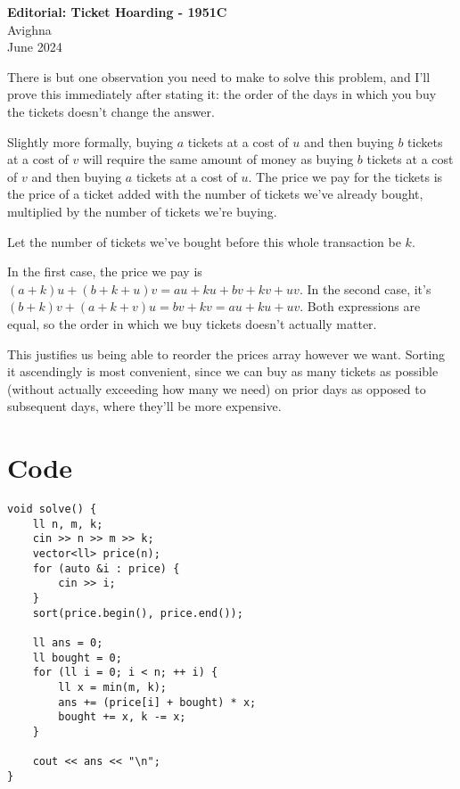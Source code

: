 \documentclass{article}
\begin{document}
\begin{center}
  \large{\textbf{Editorial: Ticket Hoarding - 1951C}}\\
  \vspace{0.2em}
  \large{Avighna}\\
  \vspace{0.2em}
  \large{June 2024}
\end{center}

There is but one observation you need to make to solve this problem, and I'll prove this immediately after stating it: the order of the days in which you buy the tickets doesn't change the answer.

Slightly more formally, buying $a$ tickets at a cost of $u$ and then buying $b$ tickets at a cost of $v$ will require the same amount of money as buying $b$ tickets at a cost of $v$ and then buying $a$ tickets at a cost of $u$. The price we pay for the tickets is the price of a ticket added with the number of tickets we've already bought, multiplied by the number of tickets we're buying.

Let the number of tickets we've bought before this whole transaction be $k$.

In the first case, the price we pay is $(a+k)u + (b+k+u)v = au + ku + bv + kv + uv$. In the second case, it's $(b+k)v + (a+k+v)u = bv+kv=au+ku+uv$. Both expressions are equal, so the order in which we buy tickets doesn't actually matter.

This justifies us being able to reorder the prices array however we want. Sorting it ascendingly is most convenient, since we can buy as many tickets as possible (without actually exceeding how many we need) on prior days as opposed to subsequent days, where they'll be more expensive.

\section{Code}
\begin{verbatim}
void solve() {
    ll n, m, k;
    cin >> n >> m >> k;
    vector<ll> price(n);
    for (auto &i : price) {
        cin >> i;
    }
    sort(price.begin(), price.end());

    ll ans = 0;
    ll bought = 0;
    for (ll i = 0; i < n; ++ i) {
        ll x = min(m, k);
        ans += (price[i] + bought) * x;
        bought += x, k -= x;
    }

    cout << ans << "\n";
}
\end{verbatim}
\end{document}
